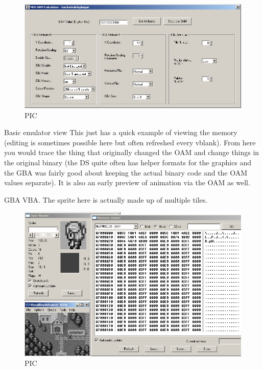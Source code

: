 \documentclass[
]{book}
\begin{document}
\begin{figure}
\centering
\includegraphics{images/30_home_fast6191_romhackingguide_unrenamed_file___orders_romhackingguidegraphicsOAMcalculator.png}
\caption{PIC}
\end{figure}

Basic emulator view This just has a quick example of viewing the memory (editing is sometimes possible here but often refreshed every vblank). From here you would trace the thing that originally changed the OAM and change things in the original binary (the DS quite often has helper formats for the graphics and the GBA was fairly good about keeping the actual binary code and the OAM values separate). It is also an early preview of animation via the OAM as well.

GBA VBA. The sprite here is actually made up of multiple tiles.

\begin{figure}
\centering
\includegraphics{images/31_home_fast6191_romhackingguide_unrenamed_files_and_original_borders_romhackingguide2dOAMvba_1.png}
\caption{PIC}
\end{figure}
\end{document}
